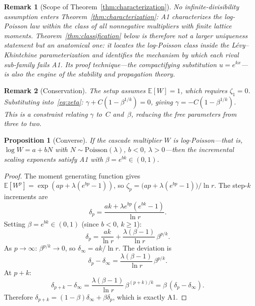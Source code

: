 \documentclass[pdflatex,sn-mathphys-num]{sn-jnl}
\theoremstyle{thmstyleone}
\newtheorem{proposition}[theorem]{Proposition}
\theoremstyle{thmstyletwo}
\newtheorem*{remark}{Remark}
\theoremstyle{thmstylethree}
\begin{document}
\begin{remark}[Scope of Theorem~\ref{thm:characterization}]
No infinite-divisibility assumption enters
Theorem~\ref{thm:characterization}: A1 characterizes the log-Poisson
law within the class of \emph{all} nonnegative multipliers with
finite lattice moments.  Theorem~\ref{thm:classification} below is
therefore not a larger uniqueness statement but an anatomical one:
it locates the log-Poisson class inside the L\'evy--Khintchine
parameterization and identifies the mechanism by which each rival
sub-family fails A1.  Its proof technique---the compactifying
substitution $u = e^{kx}$---is also the engine of the stability and
propagation theory.
\end{remark}

\begin{remark}[Conservation]
The setup assumes $\mathbb{E}[W] = 1$, which requires $\zeta_1 = 0$.
Substituting into~\eqref{eq:zeta}: $\gamma + C(1 - \beta^{1/k}) =
0$, giving $\gamma = -C(1-\beta^{1/k})$.  This is a constraint
relating $\gamma$ to~$C$ and~$\beta$, reducing the free parameters
from three to two.
\end{remark}


\begin{proposition}[Converse]\label{prop:converse}
If the cascade multiplier $W$ is log-Poisson---\allowbreak that is,
$\log W = a + bN$ with $N \sim \mathrm{Poisson}(\lambda)$, $b < 0$, $\lambda >
0$---then the incremental scaling exponents satisfy A1 with $\beta =
e^{bk} \in (0,1)$.
\end{proposition}

\begin{proof}
The moment generating function gives $\mathbb{E}[W^p] = \exp(ap +
\lambda(e^{bp} - 1))$, so $\zeta_p = \bigl(ap + \lambda(e^{bp} -
1)\bigr)/\ln r$.  The step-$k$ increments are
\[
  \delta_p = \frac{ak + \lambda e^{bp}(e^{bk}-1)}{\ln r}.
\]
Setting $\beta = e^{bk} \in (0,1)$ (since $b < 0$, $k \geq 1$):
\[
  \delta_p = \frac{ak}{\ln r}
  + \frac{\lambda(\beta - 1)}{\ln r}\,\beta^{p/k}.
\]
As $p \to \infty$: $\beta^{p/k} \to 0$, so $\delta_\infty = ak/\ln
r$.  The deviation is
\[
  \delta_p - \delta_\infty
  = \frac{\lambda(\beta - 1)}{\ln r}\,\beta^{p/k}.
\]
At $p + k$:
\[
  \delta_{p+k} - \delta_\infty
  = \frac{\lambda(\beta-1)}{\ln r}\,\beta^{(p+k)/k}
  = \beta\,(\delta_p - \delta_\infty).
\]
Therefore $\delta_{p+k} = (1-\beta)\delta_\infty + \beta\delta_p$,
which is exactly A1.
\end{proof}
\end{document}
